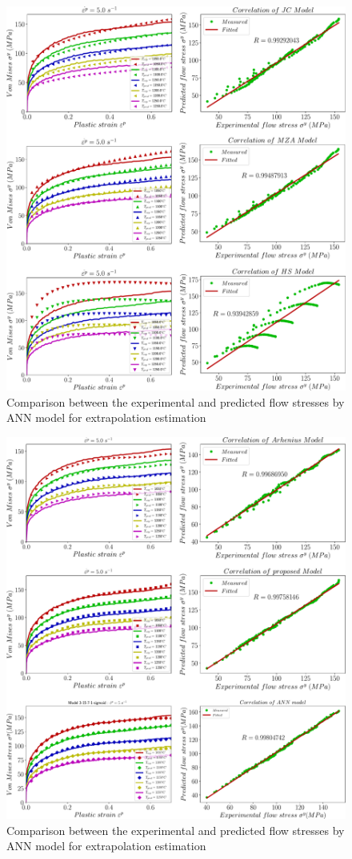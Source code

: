 \documentclass[twoside,english,1p,final,sort&compress]{elsarticle}
\theoremstyle{plain}
\begin{document}
\begin{figure}[!ht]
\centering
\includegraphics[width=0.98\columnwidth]
{newFigures/exCombinaison1}
\caption{Comparison between the experimental and predicted flow stresses by ANN model for extrapolation estimation}
\label{fig:exCombinaison1}
\end{figure}
\begin{figure}[!ht]
\centering
\includegraphics[width=1.02\columnwidth]
{newFigures/exCombinaison2}
\caption{Comparison between the experimental and predicted flow stresses by ANN model for extrapolation estimation}
\label{fig:exCombinaison2}
\end{figure}
\end{document}
